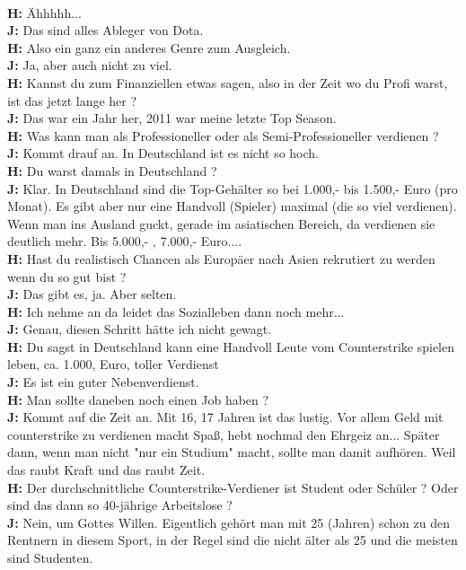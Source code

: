 \documentclass[10pt,a4paper,ngerman,twoside]{article} %
\begin{document}
\\ \textbf{H:} Ähhhhh...
\\ \textbf{J:} Das sind alles Ableger von Dota.
\\ \textbf{H:} Also ein ganz ein anderes Genre zum Ausgleich.
\\ \textbf{J:} Ja, aber auch nicht zu viel.
\\ \textbf{H:} Kannst du zum Finanziellen etwas sagen, also in der Zeit wo du Profi warst, ist das jetzt lange her ?
\\ \textbf{J:} Das war ein Jahr her, 2011 war meine letzte Top Season.
\\ \textbf{H:} Was kann man als Professioneller oder als Semi-Professioneller verdienen ?
\\ \textbf{J:} Kommt drauf an. In Deutschland ist es nicht so hoch.
\\ \textbf{H:} Du warst damals in Deutschland ?
\\ \textbf{J:} Klar. In Deutschland sind die Top-Gehälter so bei 1.000,- bis 1.500,- Euro (pro Monat). Es gibt aber nur eine Handvoll (Spieler) maximal (die so viel verdienen). Wenn man ins Ausland guckt, gerade im asiatischen Bereich, da verdienen sie deutlich mehr. Bis 5.000,- , 7.000,- Euro....
\\ \textbf{H:} Hast du realistisch Chancen als Europäer nach Asien rekrutiert zu werden wenn du so gut bist ?
\\ \textbf{J:} Das gibt es, ja. Aber selten.
\\ \textbf{H:} Ich nehme an da leidet das Sozialleben dann noch mehr...
\\ \textbf{J:} Genau, diesen Schritt hätte ich nicht gewagt.
\\ \textbf{H:} Du sagst in Deutschland kann eine Handvoll Leute vom Counterstrike spielen leben, ca. 1.000, Euro, toller Verdienst
\\ \textbf{J:} Es ist ein guter Nebenverdienst.
\\ \textbf{H:} Man sollte daneben noch einen Job haben ?
\\ \textbf{J:} Kommt auf die Zeit an. Mit 16, 17 Jahren ist das lustig. Vor allem Geld mit counterstrike zu verdienen macht Spaß, hebt nochmal den Ehrgeiz an... Später dann, wenn man nicht "nur ein Studium" macht, sollte man damit aufhören. Weil das raubt Kraft und das raubt Zeit.
\\ \textbf{H:} Der durchschnittliche Counterstrike-Verdiener ist  Student oder Schüler ? Oder sind das dann so 40-jährige Arbeitslose ?
\\ \textbf{J:} Nein, um Gottes Willen. Eigentlich gehört man mit 25 (Jahren) schon zu den Rentnern in diesem Sport, in der Regel sind die nicht älter als 25 und die meisten sind Studenten.
\end{document}
